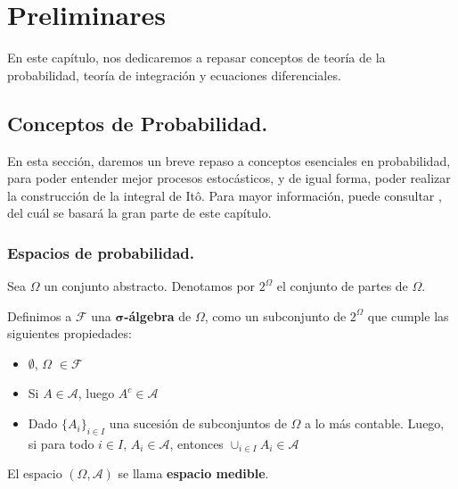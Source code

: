 
\chapter{Preliminares}


En este capítulo, nos dedicaremos a repasar conceptos de teoría de la probabilidad, teoría de integración y ecuaciones diferenciales. 


























\section{Conceptos de Probabilidad.}

En esta sección, daremos un breve repaso a conceptos esenciales en probabilidad, para poder entender mejor procesos estocásticos, y de igual forma, poder realizar la construcción de la integral de Itô. Para mayor información, puede consultar \cite{Probability_Essentials}, del cuál se basará la gran parte de este capítulo.

\subsection{Espacios de probabilidad.}

Sea $\Omega$ un conjunto abstracto. Denotamos por $2^{\Omega}$ el conjunto de partes de $\Omega$.

\begin{boxDef}
Definimos a $\mathcal{F}$ una $\mathbf{\sigma}$\textbf{-álgebra} de $\Omega$, como un subconjunto de $2^{\Omega}$ que cumple las siguientes propiedades:

	\begin{itemize}
		\item $\emptyset$, $\Omega$ $\in \mathcal{F}$
		\item Si $A \in \mathcal{A}$, luego $A^{c} \in \mathcal{A}$
		\item Dado $\{ A_i \}_{i \in I}$ una sucesión de subconjuntos de $\Omega$ a lo más contable. Luego, si para todo $i \in I$, $A_i \in \mathcal{A}$, entonces $\cup_{i \in I} A_i \in \mathcal{A}$ 
	\end{itemize}

El espacio $\left( \Omega, \mathcal{A} \right)$ se llama \textbf{espacio medible}.

\end{boxDef}



